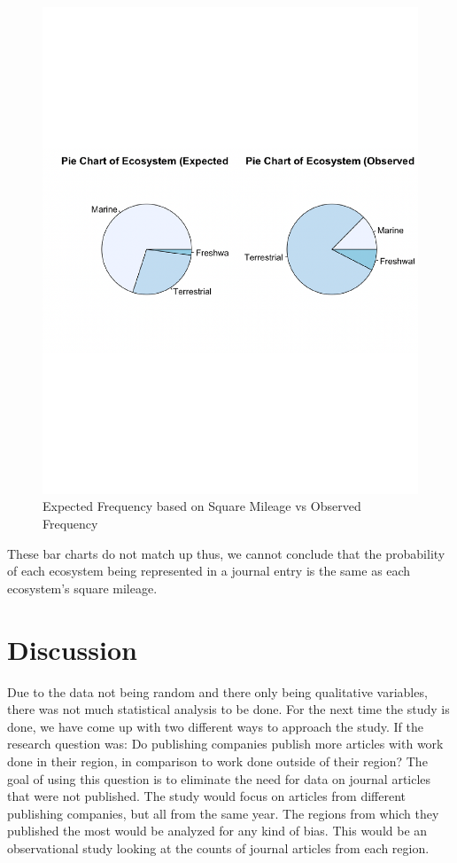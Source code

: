 \documentclass[
]{article}
\begin{document}
\begin{figure}
  \caption{Expected Frequency based on Square Mileage vs Observed Frequency}
    \includegraphics[width=13cm]{pie-eco-2.pdf}
\end{figure}

These bar charts do not match up thus, we cannot conclude that the
probability of each ecosystem being represented in a journal entry is
the same as each ecosystem's square mileage.

\hypertarget{discussion}{%
\section{Discussion}\label{discussion}}

Due to the data not being random and there only being qualitative
variables, there was not much statistical analysis to be done. For the
next time the study is done, we have come up with two different ways to
approach the study. If the research question was: Do publishing
companies publish more articles with work done in their region, in
comparison to work done outside of their region? The goal of using this
question is to eliminate the need for data on journal articles that were
not published. The study would focus on articles from different
publishing companies, but all from the same year. The regions from which
they published the most would be analyzed for any kind of bias. This
would be an observational study looking at the counts of journal
articles from each region.
\end{document}
